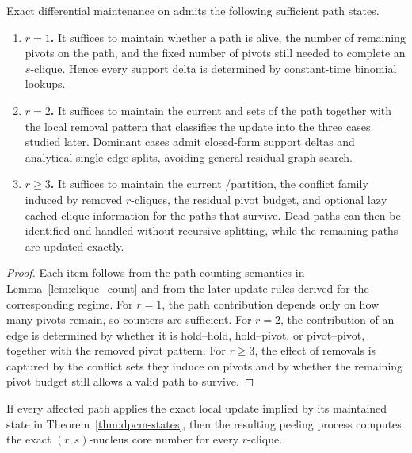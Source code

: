 \begin{theorem}\label{thm:dpcm-states}
Exact differential maintenance on \cpi admits the following sufficient path states.
\begin{enumerate}[leftmargin=*]
    \item \textbf{$r{=}1$.}
    It suffices to maintain whether a path is alive, the number of remaining pivots on the path, and the fixed number of pivots still needed to complete an $s$-clique.
    Hence every support delta is determined by constant-time binomial lookups.

    \item \textbf{$r{=}2$.}
    It suffices to maintain the current \hold and \pivot sets of the path together with the local removal pattern that classifies the update into the three cases studied later.
    Dominant cases admit closed-form support deltas and analytical single-edge splits, avoiding general residual-graph search.

    \item \textbf{$r{\ge}3$.}
    It suffices to maintain the current \hold/\pivot partition, the conflict family induced by removed $r$-cliques, the residual pivot budget, and optional lazy cached clique information for the paths that survive.
    Dead paths can then be identified and handled without recursive splitting, while the remaining paths are updated exactly.
\end{enumerate}
\end{theorem}

\begin{proof}
Each item follows from the path counting semantics in Lemma~\ref{lem:clique_count} and from the later update rules derived for the corresponding regime.
%
For $r{=}1$, the path contribution depends only on how many pivots remain, so counters are sufficient.
%
For $r{=}2$, the contribution of an edge is determined by whether it is hold--hold, hold--pivot, or pivot--pivot, together with the removed pivot pattern.
%
For $r{\ge}3$, the effect of removals is captured by the conflict sets they induce on pivots and by whether the remaining pivot budget still allows a valid path to survive.
\end{proof}

\begin{corollary}\label{coro:dpcm-exact}
If every affected path applies the exact local update implied by its maintained state in Theorem~\ref{thm:dpcm-states}, then the resulting peeling process computes the exact $(r,s)$-nucleus core number for every $r$-clique.
\end{corollary}

